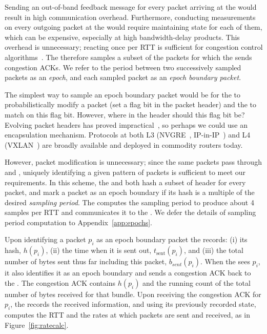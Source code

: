 Sending an out-of-band feedback message for every packet arriving at the \outbox would result in high communication overhead. 
Furthermore, conducting measurements on every outgoing packet at the \inbox would require maintaining state for each of them, which can be expensive, especially at high bandwidth-delay products. 
This overhead is unnecessary; reacting once per RTT is sufficient for congestion control algorithms~\cite{ccp}. 
The \inbox therefore samples a subset of the packets for which the \outbox sends congestion ACKs.
We refer to the period between two successively sampled packets as an \emph{epoch}, and each sampled packet as an \emph{epoch boundary packet}.

The simplest way to sample an epoch boundary packet would be for the \inbox to probabilistically modify a packet (\ie set a flag bit in the packet header) and the \outbox to match on this flag bit.
However, where in the header should this flag bit be?
Evolving packet headers has proved impractical~\cite{trotsky}, so perhaps we could use an encapsulation mechanism.
Protocols at both L3 (\eg NVGRE~\cite{nvgre}, IP-in-IP~\cite{ipinip}) and L4 (\eg VXLAN~\cite{vxlan}) are broadly available and deployed in commodity routers today.

However, packet modification is unnecessary; since the same packets pass through \inbox and \outbox, uniquely identifying a given pattern of packets is sufficient to meet our requirements. In this scheme, the \inbox and \outbox both hash a subset of header for every packet, and mark a packet as an epoch boundary if its hash is a multiple of the desired \emph{sampling period}. The \inbox computes the sampling period to produce about 4 samples per RTT and communicates it to the \outbox. We defer the details of sampling period computation to Appendix~\ref{app:epochs}. 

Upon identifying a packet $p_i$ as an epoch boundary packet the \inbox records: 
(i) its hash, $h(p_i)$, 
(ii) the time when it is sent out, $t_{\text{sent}}(p_i)$, 
and (iii) the total number of bytes sent thus far including this packet, $b_{sent}(p_i)$. 
When the \outbox sees $p_i$, it also identifies it as an epoch boundary and sends a congestion ACK back to the \inbox. 
The congestion ACK contains $h(p_i)$ and the running count of the total number of bytes received for that bundle. 
Upon receiving the congestion ACK for $p_i$, the \inbox records the received information, and using its previously recorded state, computes the RTT and the rates at which packets are sent and received, as in Figure~\ref{fig:ratecalc}. 

